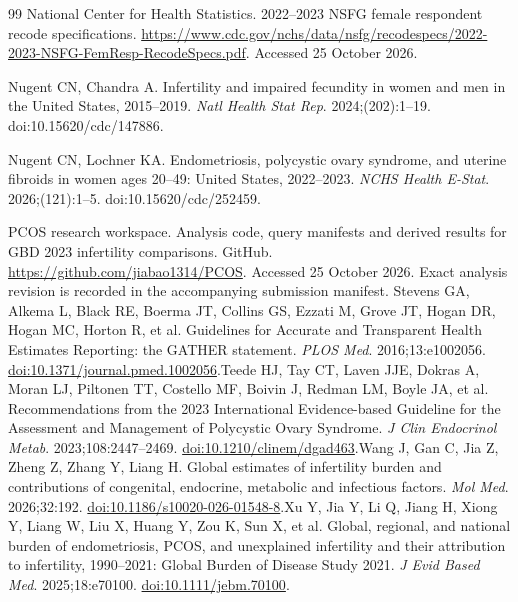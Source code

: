 \documentclass[11pt,a4paper]{article}
\begin{document}
{\begin{thebibliography}{99}
 National Center for Health Statistics. 2022--2023 NSFG female respondent recode specifications. \url{https://www.cdc.gov/nchs/data/nsfg/recodespecs/2022-2023-NSFG-FemResp-RecodeSpecs.pdf}. Accessed 25 October 2026.

 Nugent CN, Chandra A. Infertility and impaired fecundity in women and men in the United States, 2015--2019. \emph{Natl Health Stat Rep}. 2024;(202):1--19. doi:10.15620/cdc/147886.

 Nugent CN, Lochner KA. Endometriosis, polycystic ovary syndrome, and uterine fibroids in women ages 20--49: United States, 2022--2023. \emph{NCHS Health E-Stat}. 2026;(121):1--5. doi:10.15620/cdc/252459.

 PCOS research workspace. Analysis code, query manifests and derived results for GBD 2023 infertility comparisons. GitHub. \url{https://github.com/jiabao1314/PCOS}. Accessed 25 October 2026. Exact analysis revision is recorded in the accompanying submission manifest.
Stevens GA, Alkema L, Black RE, Boerma JT, Collins GS, Ezzati M, Grove JT, Hogan DR, Hogan MC, Horton R, et al. Guidelines for Accurate and Transparent Health Estimates Reporting: the GATHER statement. \emph{PLOS Med}. 2016;13:e1002056. \href{https://doi.org/10.1371/journal.pmed.1002056}{doi:10.1371/journal.pmed.1002056}.Teede HJ, Tay CT, Laven JJE, Dokras A, Moran LJ, Piltonen TT, Costello MF, Boivin J, Redman LM, Boyle JA, et al. Recommendations from the 2023 International Evidence-based Guideline for the Assessment and Management of Polycystic Ovary Syndrome. \emph{J Clin Endocrinol Metab}. 2023;108:2447--2469. \href{https://doi.org/10.1210/clinem/dgad463}{doi:10.1210/clinem/dgad463}.Wang J, Gan C, Jia Z, Zheng Z, Zhang Y, Liang H. Global estimates of infertility burden and contributions of congenital, endocrine, metabolic and infectious factors. \emph{Mol Med}. 2026;32:192. \href{https://doi.org/10.1186/s10020-026-01548-8}{doi:10.1186/s10020-026-01548-8}.Xu Y, Jia Y, Li Q, Jiang H, Xiong Y, Liang W, Liu X, Huang Y, Zou K, Sun X, et al. Global, regional, and national burden of endometriosis, PCOS, and unexplained infertility and their attribution to infertility, 1990--2021: Global Burden of Disease Study 2021. \emph{J Evid Based Med}. 2025;18:e70100. \href{https://doi.org/10.1111/jebm.70100}{doi:10.1111/jebm.70100}.\end{thebibliography}
}
\end{document}
